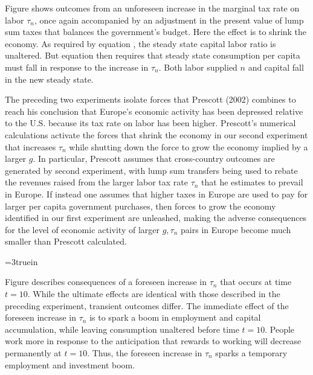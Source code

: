 \medskip
{}
Figure  shows outcomes from an unforeseen increase in the marginal tax rate on labor $\tau_n$, once again
accompanied by an adjustment in the present value of lump sum taxes that balances the government's budget.
Here the effect is to shrink the economy.  As required by equation , the steady state
capital labor ratio is unaltered.  But equation  then requires that steady state consumption
per capita must fall in response to the increase in $\tau_n$.  Both labor supplied $n$ and capital fall in the new steady state.
\medskip

The preceding two experiments isolate forces that Prescott (2002) combines to reach his conclusion that Europe's
economic activity has been depressed relative to the U.S. because its tax rate on labor has  been higher.  Prescott's numerical
calculations activate the forces that shrink the economy in our second experiment that increases $\tau_n$  while shutting  down the force to grow
the economy implied by a larger $g$.  In particular, Prescott assumes that  cross-country outcomes are generated by  second experiment, with  lump sum transfers being used to rebate the revenues raised from the larger labor tax rate $\tau_n$ that  he estimates to prevail in  Europe.
If instead one assumes that higher taxes in Europe are used to pay for larger per capita government purchases, then  forces to grow the economy identified
in our first experiment are unleashed, making  the adverse consequences for the level of economic activity of larger $g, \tau_n$ pairs in Europe  become much smaller than Prescott calculated.
%

\centerline{\epsfxsize=3truein}
\caption{Elastic labor supply: response to unforeseen increase  in $\tau_n$ at $t=0$.
From left to right, top to bottom: $k, c, n, \bar R, w, \tau_n$. The dashed line is the original
steady state.}
\endfigure


\vfil\eject
\medskip
{}
Figure  describes consequences of a foreseen increase in $\tau_n$ that occurs at time $t=10$.   While the ultimate
effects are identical with those described in the preceding experiment,  transient outcomes differ.
The immediate effect of the foreseen increase in $\tau_n$ is to spark a boom in employment and capital accumulation, while leaving
consumption unaltered before time $t=10$.  People work more in response to the anticipation that rewards to working will decrease permanently
at $t=10$.  Thus, the foreseen increase in $\tau_n$ sparks a temporary employment and  investment boom.

